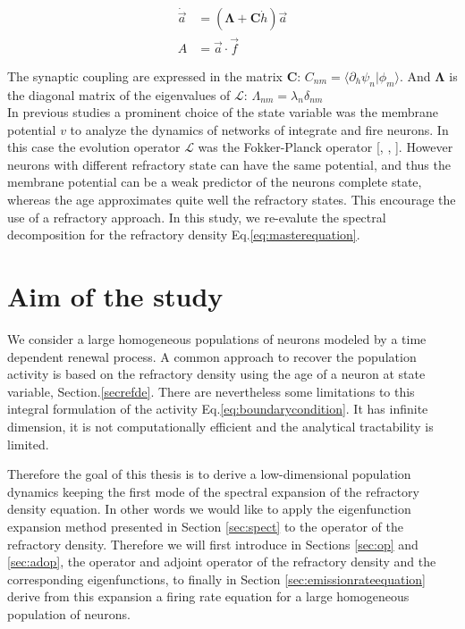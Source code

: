 \documentclass[12pt,twoside]{report}
\begin{document}
\begin{align}
\dot{\vec{a}}&=(\boldsymbol{\Lambda}+\boldsymbol{C}\dot{h})\vec{a}\\
A&=\vec{a}\cdot\vec{f}
\end{align}


The synaptic coupling are expressed in the matrix $\boldsymbol{C}$: $C_{nm}=\langle\partial_h\psi_n|\phi_m\rangle$. And $\boldsymbol{\Lambda}$ is the diagonal matrix of the eigenvalues of $\mathcal{L}$:  $\Lambda_{nm}=\lambda_n\delta_{nm}$ \\



 In previous studies a prominent choice of the state variable was the membrane potential $v$ to analyze the dynamics of networks of integrate and fire neurons.  In this case the evolution operator $\mathcal{L}$ was the Fokker-Planck operator [\cite{MatGiu02}, \cite{GerKis02}, \cite{SchOst13}]. However neurons with different refractory state can have the same potential, and thus the membrane potential can be a weak predictor of the neurons complete state, whereas the age approximates quite well the refractory states. This encourage the use of a refractory approach. In this study, we re-evalute the spectral decomposition for the refractory density Eq.\eqref{eq:masterequation}. 


\section{Aim of the study}


We consider a large homogeneous populations of neurons modeled by a time dependent renewal process. A common approach to recover the population activity is based on the refractory density using the age of a neuron at state variable, Section.\ref{secrefde}. There are nevertheless some limitations to this integral formulation of the activity Eq.\eqref{eq:boundarycondition}. It has infinite dimension, it is not computationally efficient and the analytical tractability is limited.

Therefore the goal of this thesis is to derive a low-dimensional population dynamics keeping the first mode of the spectral expansion of the refractory density equation. In other words we would like to apply the eigenfunction expansion method presented in Section \ref{sec:spect} to the operator of the refractory density. Therefore we will first introduce in Sections \ref{sec:op} and \ref{sec:adop}, the operator and adjoint operator of the refractory density and the corresponding eigenfunctions, to finally  in Section \ref{sec:emissionrateequation} derive from this expansion a firing rate equation for a large homogeneous population of neurons. 
\end{document}
